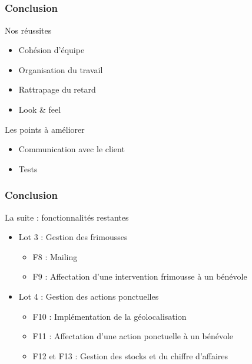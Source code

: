 \subsection{} %

\speaker{\Francois}
\begin{frame}
\frametitle{Conclusion}
\begin{block}{Nos réussites}
	\begin{itemize}
		\item Cohésion d'équipe
		\item Organisation du travail
		\item Rattrapage du retard
		\item Look \& feel
	\end{itemize}
\end{block}
\begin{block}{Les points à améliorer}
	\begin{itemize}
		\item Communication avec le client
		\item Tests
	\end{itemize}
\end{block}
\end{frame}
	
\begin{frame}
\frametitle{Conclusion}
\begin{block}{La suite : fonctionnalités restantes}
	\begin{itemize}
		\item Lot 3 : Gestion des frimousses
		\begin{itemize}
			\item F8 : Mailing
			\item F9 : Affectation d'une intervention frimousse à un bénévole
		\end{itemize}
		\vspace{.5cm}
		\item Lot 4 : Gestion des actions ponctuelles
		\begin{itemize}
			\item F10 : Implémentation de la géolocalisation
			\item F11 : Affectation d'une action ponctuelle à un bénévole
			\item F12 et F13 : Gestion des stocks et du chiffre d'affaires
		\end{itemize}
	\end{itemize}
\end{block}
\end{frame}
